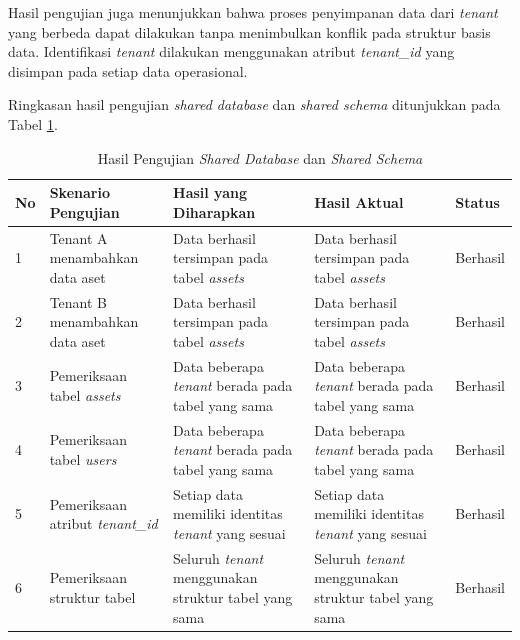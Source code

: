 Hasil pengujian juga menunjukkan bahwa proses penyimpanan data dari \textit{tenant} yang berbeda dapat dilakukan tanpa menimbulkan konflik pada struktur basis data. Identifikasi \textit{tenant} dilakukan menggunakan atribut \textit{tenant\_id} yang disimpan pada setiap data operasional.

Ringkasan hasil pengujian \textit{shared database} dan \textit{shared schema} ditunjukkan pada Tabel \ref{tab:hasil_pengujian_shared_database}.

\begin{table}[H]
  \centering
  \caption{Hasil Pengujian \textit{Shared Database} dan \textit{Shared Schema}}
  \label{tab:hasil_pengujian_shared_database}
  \footnotesize
  \begin{tabular}{|l|>{\raggedright\arraybackslash}p{3.2cm}|>{\raggedright\arraybackslash}p{3.5cm}|>{\raggedright\arraybackslash}p{3.5cm}|>{\raggedright\arraybackslash}p{1.8cm}|}
    \hline
    \rowcolor[HTML]{EFEFEF}
    \textbf{No} & \textbf{Skenario Pengujian} & \textbf{Hasil yang Diharapkan} & \textbf{Hasil Aktual} & \textbf{Status} \\
    \hline
    1 & Tenant A menambahkan data aset & Data berhasil tersimpan pada tabel \textit{assets} & Data berhasil tersimpan pada tabel \textit{assets} & Berhasil \\
    \hline
    2 & Tenant B menambahkan data aset & Data berhasil tersimpan pada tabel \textit{assets} & Data berhasil tersimpan pada tabel \textit{assets} & Berhasil \\
    \hline
    3 & Pemeriksaan tabel \textit{assets} & Data beberapa \textit{tenant} berada pada tabel yang sama & Data beberapa \textit{tenant} berada pada tabel yang sama & Berhasil \\
    \hline
    4 & Pemeriksaan tabel \textit{users} & Data beberapa \textit{tenant} berada pada tabel yang sama & Data beberapa \textit{tenant} berada pada tabel yang sama & Berhasil \\
    \hline
    5 & Pemeriksaan atribut \textit{tenant\_id} & Setiap data memiliki identitas \textit{tenant} yang sesuai & Setiap data memiliki identitas \textit{tenant} yang sesuai & Berhasil \\
    \hline
    6 & Pemeriksaan struktur tabel & Seluruh \textit{tenant} menggunakan struktur tabel yang sama & Seluruh \textit{tenant} menggunakan struktur tabel yang sama & Berhasil \\
    \hline
  \end{tabular}
\end{table}

